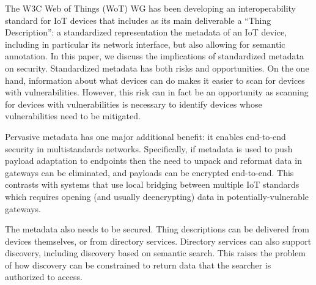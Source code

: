 The W3C Web of Things (WoT) WG has been developing an interoperability standard for IoT devices that includes as
its main deliverable a ``Thing Description'': a standardized representation the metadata of an 
IoT device, including in particular its network interface, but also allowing for semantic annotation.
In this paper, we discuss the implications of standardized metadata on security.
Standardized metadata has both risks and opportunities.
On the one hand, information about what devices can do makes it easier to scan for devices with 
vulnerabilities.  However, this risk can in fact be an opportunity as scanning for devices with
vulnerabilities is necessary to identify devices whose vulnerabilities need to be mitigated.

Pervasive metadata has one major additional benefit: it enables end-to-end security in multistandards networks.
Specifically, if metadata is used to push payload adaptation to endpoints then the need to unpack and
reformat data in gateways can be eliminated, and payloads can be encrypted end-to-end.  This contrasts
with systems that use local bridging between multiple IoT standards which requires opening (and usually
deencrypting) data in potentially-vulnerable gateways.

The metadata also needs to be secured.  Thing descriptions can be delivered from devices themselves, or
from directory services. Directory services can also support discovery, including discovery based on
semantic search.  This raises the problem of how discovery can be constrained to return data that
the searcher is authorized to access.

